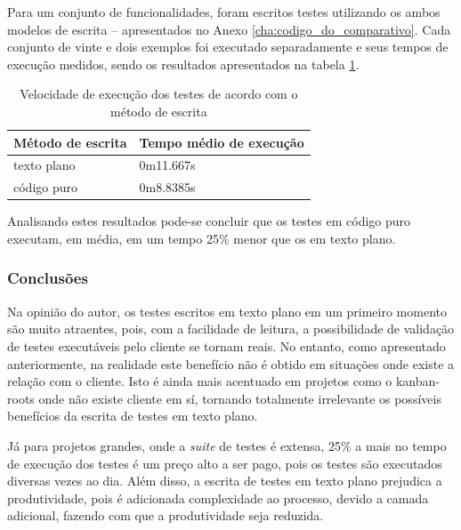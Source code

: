 Para um conjunto de funcionalidades, foram escritos testes utilizando os ambos modelos de escrita – apresentados no Anexo \ref{cha:codigo_do_comparativo}. Cada conjunto de vinte e dois exemplos foi executado separadamente e seus tempos de execução medidos, sendo os resultados apresentados na tabela \ref{table:tempo_de_execucao}.

\begin{table}[ht]
\caption{Velocidade de execução dos testes de acordo com o método de escrita}
\label{table:tempo_de_execucao}
\centering
\begin{tabular}{p{4.5cm} p{6.5cm}}
\toprule
\textbf{Método de escrita} & \textbf{Tempo médio de execução} \\
\midrule[1pt]
texto plano & 0m11.667s \\ \midrule
código puro & 0m8.8385s \\
\bottomrule
\end{tabular}
\end{table}

Analisando estes resultados pode-se concluir que os testes em código puro executam, em média, em um tempo 25\% menor que os em texto plano.


\subsubsection{Conclusões} %
\label{subsub:conclusoes_bdd}

Na opinião do autor, os testes escritos em texto plano em um primeiro momento são muito atraentes, pois, com a facilidade de leitura, a possibilidade de validação de testes executáveis pelo cliente se tornam reais. No entanto, como apresentado anteriormente, na realidade este benefício não é obtido em situações onde existe a relação com o cliente. Isto é ainda mais acentuado em projetos como o kanban-roots onde não existe cliente em sí, tornando totalmente irrelevante os possíveis benefícios da escrita de testes em texto plano.

Já para projetos grandes, onde a \textit{suite} de testes é extensa, 25\% a mais no tempo de execução dos testes é um preço alto a ser pago, pois os testes são executados diversas vezes ao dia. Além disso, a escrita de testes em texto plano prejudica a produtividade, pois é adicionada complexidade ao processo, devido a camada adicional, fazendo com que a produtividade seja reduzida.


